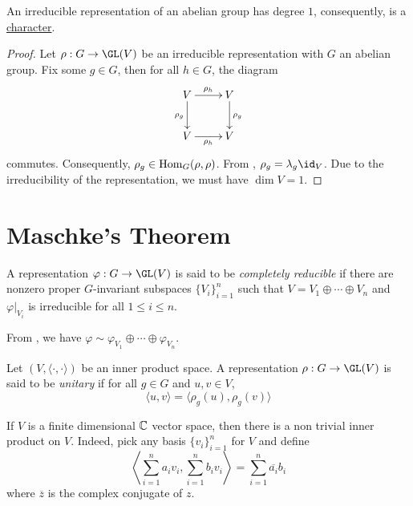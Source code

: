 \begin{corollary}
    An irreducible representation of an abelian group has degree $1$, consequently, is a \underline{character}.
\end{corollary}
\begin{proof}
    Let $\rho: G\to\GL(V)$ be an irreducible representation with $G$ an abelian group. Fix some $g\in G$, then for all $h\in G$, the diagram 
    \begin{equation*}
        \xymatrix{
            V\ar[r]^{\rho_h}\ar[d]_{\rho_g} & V\ar[d]^{\rho_g}\\
            V\ar[r]_{\rho_h} & V
        }
    \end{equation*}
    commutes. Consequently, $\rho_g\in\operatorname{Hom}_G(\rho,\rho)$. From , $\rho_g = \lambda_g\id_V$. Due to the irreducibility of the representation, we must have $\dim V = 1$.
\end{proof}

\section{Maschke's Theorem}

\begin{definition}
    A representation $\varphi: G\to\GL(V)$ is said to be \textit{completely reducible} if there are nonzero proper $G$-invariant subspaces $\{V_i\}_{i = 1}^n$ such that $V = V_1\oplus\cdots\oplus V_n$ and $\varphi|_{V_i}$ is irreducible for all $1\le i\le n$.
\end{definition}

From , we have $\varphi\sim\varphi_{V_1}\oplus\cdots\oplus\varphi_{V_n}$.

\begin{definition}
    Let $(V,\langle\cdot,\cdot\rangle)$ be an inner product space. A representation $\rho: G\to\GL(V)$ is said to be \textit{unitary} if for all $g\in G$ and $u,v\in V$, 
    \begin{equation*}
        \langle u,v\rangle = \langle\rho_g(u),\rho_g(v)\rangle
    \end{equation*}
\end{definition}

\begin{remark}
    If $V$ is a finite dimensional $\mathbb{C}$ vector space, then there is a non trivial inner product on $V$. Indeed, pick any basis $\{v_i\}_{i = 1}^n$ for $V$ and define 
    \begin{equation*}
        \left\langle\sum_{i = 1}^na_iv_i, \sum_{i = 1}^n b_iv_i\right\rangle = \sum_{i = 1}^n\overline{a_i}b_i
    \end{equation*}
    where $\overline z$ is the complex conjugate of $z$.
\end{remark}

